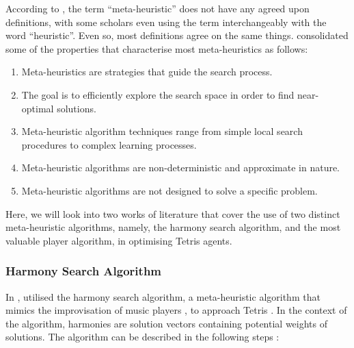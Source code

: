\documentclass[a4paper, 12pt]{extreport}
\begin{document}
				
				According to \citeauthor{yang2020nature} \cite{yang2020nature}, the term ``meta-heuristic'' does not have any agreed upon definitions, with some scholars even using the term interchangeably with the word ``heuristic''. Even so, most definitions agree on the same things. \citeauthor{metaheuristic} \cite{metaheuristic} consolidated some of the properties that characterise most meta-heuristics as follows:
				
				\begin{enumerate}
					\item Meta-heuristics are strategies that guide the search process.
					\item The goal is to efficiently explore the search space in order to find near-optimal solutions.
					\item Meta-heuristic algorithm techniques range from simple local search procedures to complex learning processes.
					\item Meta-heuristic algorithms are non-deterministic and approximate in nature.
					\item Meta-heuristic algorithms are not designed to solve a specific problem.
				\end{enumerate}
				
				Here, we will look into two works of literature that cover the use of two distinct meta-heuristic algorithms, namely, the harmony search algorithm, and the most valuable player algorithm, in optimising Tetris agents.
				
				\subsubsection{Harmony Search Algorithm}
					
					In \citeyear{tetris-harmony-search}, \citeauthor{tetris-harmony-search} utilised the harmony search algorithm, a meta-heuristic algorithm that mimics the improvisation of music players \cite{harmony-search}, to approach Tetris \cite{tetris-harmony-search}. In the context of the algorithm, harmonies are solution vectors containing potential weights of solutions. The algorithm can be described in the following steps \cite{tetris-harmony-search}:
					
\end{document}
